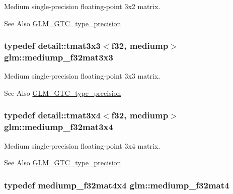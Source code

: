 Medium single-\/precision floating-\/point 3x2 matrix. \begin{DoxySeeAlso}{See Also}
\hyperlink{group__gtc__type__precision}{G\-L\-M\-\_\-\-G\-T\-C\-\_\-type\-\_\-precision} 
\end{DoxySeeAlso}
\hypertarget{group__gtc__type__precision_gad4d01189a1462366b143c5cbc3de0ea9}{
\subsubsection[{mediump\-\_\-f32mat3x3}]{\setlength{\rightskip}{0pt plus 5cm}typedef detail\-::tmat3x3$<$f32, mediump$>$ {\bf glm\-::mediump\-\_\-f32mat3x3}}}\label{group__gtc__type__precision_gad4d01189a1462366b143c5cbc3de0ea9}
Medium single-\/precision floating-\/point 3x3 matrix. \begin{DoxySeeAlso}{See Also}
\hyperlink{group__gtc__type__precision}{G\-L\-M\-\_\-\-G\-T\-C\-\_\-type\-\_\-precision} 
\end{DoxySeeAlso}
\hypertarget{group__gtc__type__precision_ga7ad59b967576d930f4c8aa7b8c48e1af}{
\subsubsection[{mediump\-\_\-f32mat3x4}]{\setlength{\rightskip}{0pt plus 5cm}typedef detail\-::tmat3x4$<$f32, mediump$>$ {\bf glm\-::mediump\-\_\-f32mat3x4}}}\label{group__gtc__type__precision_ga7ad59b967576d930f4c8aa7b8c48e1af}
Medium single-\/precision floating-\/point 3x4 matrix. \begin{DoxySeeAlso}{See Also}
\hyperlink{group__gtc__type__precision}{G\-L\-M\-\_\-\-G\-T\-C\-\_\-type\-\_\-precision} 
\end{DoxySeeAlso}
\hypertarget{group__gtc__type__precision_ga56bd98ec31b6abc0315d688d4ecd94a0}{
\subsubsection[{mediump\-\_\-f32mat4}]{\setlength{\rightskip}{0pt plus 5cm}typedef mediump\-\_\-f32mat4x4 {\bf glm\-::mediump\-\_\-f32mat4}}}\label{group__gtc__type__precision_ga56bd98ec31b6abc0315d688d4ecd94a0}
